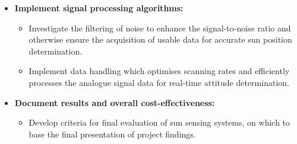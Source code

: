 \begin{itemize}
\item \textbf{Implement signal processing algorithms:}
\begin{itemize}
    \item Investigate the filtering of noise to enhance the signal-to-noise ratio and otherwise ensure the acquisition of usable data for accurate sun position determination.
    \item Implement data handling which optimises scanning rates and efficiently processes the analogue signal data for real-time attitude determination.
\end{itemize}

\item \textbf{Document results and overall cost-effectiveness:}
\begin{itemize}
    \item Develop criteria for final evaluation of sun sensing systems, on which to base the final presentation of project findings. 
\end{itemize}
\end{itemize}